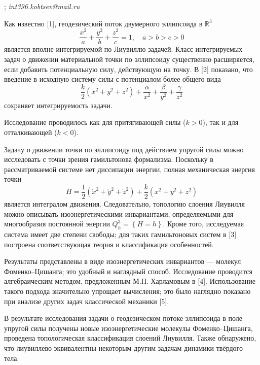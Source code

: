 

; {\it int396.kobtsev@mail.ru}

\vzmscaption


Как известно [1], геодезический поток двумерного эллипсоида в $\mathbb{R}^3$
$$
\frac{x^2}{a}+\frac{y^2}{b}+\frac{z^2}{c}=1,\quad a>b>c>0
$$
является вполне интегрируемой по Лиувиллю задачей. Класс интегрируемых задач о движении материальной точки по эллипсоиду существенно расширяется, если добавить потенциальную силу, действующую на точку. В [2] показано, что введение в исходную систему силы с потенциалом более общего вида
$$
\frac{k}{2}\left( x^2+y^2+z^2\right)+\frac{\alpha}{x^2}+\frac{\beta}{y^2}+\frac{\gamma}{z^2}
$$
сохраняет интегрируемость задачи.

Исследование проводилось как для притягивающей силы
\linebreak
($k>0$), так и для отталкивающей ($k<0$).


Задачу о движении точки по эллипсоиду под действием упругой силы можно исследовать с точки зрения гамильтонова формализма. Поскольку в рассматриваемой системе нет диссипации энергии, полная механическая энергия точки
$$
H=\frac{1}{2}\left(\dot x^2+\dot y^2+\dot z^2\right)+\frac{k}{2}\left(x^2+y^2+z^2\right)
$$
является интегралом движения. Следовательно, топологию слоения Лиувилля можно описывать изоэнергетическими инвариантами, определяемыми для многообразия постоянной энергии $Q^3_h=\left\{H=h \right\}$. Кроме того, исследуемая система имеет две степени свободы; для таких гамильтоновых систем в [3] построена соответствующая теория и  классификация особенностей.


Результаты представлены в виде изоэнергетических инвариантов --- молекул Фоменко--Цишанга;
это удобный и наглядный способ.
Исследование проводится алгебраическим методом,
\linebreak
предложенным М.П. Харламовым в [4].
Использование такого подхода значительно упрощает вычисления;
это было наглядно показано при анализе других задач классической механики [5].

В результате исследования задачи о геодезическом потоке эллипсоида в поле упругой силы получены новые изоэнергетические молекулы Фоменко--Цишанга, проведена топологическая классификация слоений Лиувилля. Также обнаружено, что лиувиллево эквивалентны некоторым другим задачам динамики твёрдого тела.


